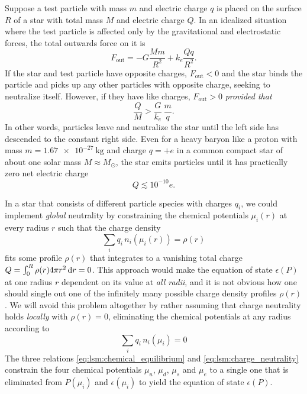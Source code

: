 Suppose a test particle with mass $m$ and electric charge $q$
is placed on the surface $R$ of a star with total mass $M$ and electric charge $Q$.
In an idealized situation where the test particle is affected only by the gravitational and electrostatic forces,
the total outwards force on it is
\begin{equation}
F_\text{out} = -G \frac{M m}{R^2} + k_e \frac{Q q}{R^2} .
\end{equation}
If the star and test particle have opposite charges, $F_\text{out} < 0$ and the star binds the particle and picks up any other particles with opposite charge, seeking to neutralize itself.
However, if they have like charges, $F_\text{out} > 0$ \emph{provided that}
\begin{equation}
\frac{Q}{M} > \frac{G}{k_e} \, \frac{m}{q}.
\end{equation}
In other words, particles leave and neutralize the star until the left side has descended to the constant right side.
Even for a heavy baryon like a proton with mass $m = \SI{1.67e-27}{\kilogram}$ and charge $q = +e$ in a common compact star of about one solar mass $M \approx M_\odot$,
the star emits particles until it has practically zero net electric charge
\begin{equation}
Q \lesssim 10^{-10} e .
\end{equation}

In a star that consists of different particle species with charges $q_i$,
we could implement \emph{global} neutrality by constraining the chemical potentials $\mu_i(r)$ at every radius $r$ such that the charge density
\begin{equation}
	\sum_i q_i \, n_i(\mu_i(r)) = \rho(r)
\label{eq:intro:charge_neutrality_global}
\end{equation}
fits some profile $\rho(r)$ that
integrates to a vanishing total charge $Q = \int_0^R \rho(r) 4 \pi r^2 \mathop{}\!\mathrm{d} r = 0$.
This approach would make the equation of state $\epsilon(P)$ at one radius $r$ dependent on its value at \emph{all radii},
and it is not obvious how one should single out one of the infinitely many possible charge density profiles $\rho(r)$.
We will avoid this problem altogether by rather assuming that charge neutrality holds \emph{locally} with $\rho(r) = 0$,
eliminating the chemical potentials at any radius according to
\begin{equation}
	\sum_i q_i \, n_i(\mu_i) = 0
\label{eq:lsm:charge_neutrality}
\end{equation}
The three relations \eqref{eq:lsm:chemical_equilibrium} and \eqref{eq:lsm:charge_neutrality}
constrain the four chemical potentials $\mu_u$, $\mu_d$, $\mu_s$ and $\mu_e$
to a single one that is eliminated from $P(\mu_i)$ and $\epsilon(\mu_i)$
to yield the equation of state $\epsilon(P)$.

